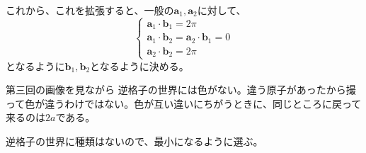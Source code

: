\documentclass[titlepage]{ltjsarticle}
\begin{document}
これから、これを拡張すると、一般の\(\bm{a}_1,\bm{a}_2\)に対して、
\begin{equation}
  \begin{cases}
    \bm{a}_1 \cdot \bm{b}_1 = 2 \pi \\
    \bm{a}_1 \cdot \bm{b}_2 =\bm{a}_2 \cdot \bm{b}_1 =0 \\
    \bm{a}_2 \cdot \bm{b}_2 = 2 \pi
  \end{cases}
\end{equation}
となるように\(\bm{b}_1,\bm{b}_2\)となるように決める。

第三回の画像を見ながら
逆格子の世界には色がない。違う原子があったから撮って色が違うわけではない。色が互い違いにちがうときに、同じところに戻って来るのは\(2a\)である。

逆格子の世界に種類はないので、最小になるように選ぶ。
\end{document}
